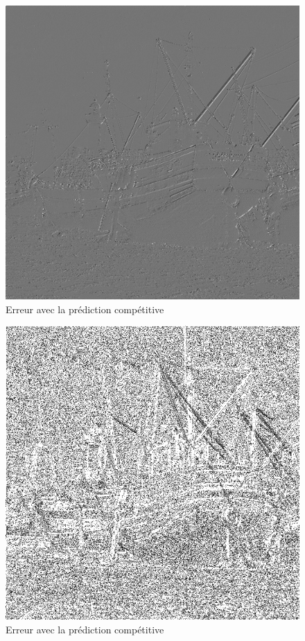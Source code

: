 \documentclass[12pt]{report}
\begin{document}
\begin{figure}[H]
\begin{center}
\includegraphics[scale=0.4]{../ImageRes/ImagecodeeCompetitifQ1.jpg} 
\caption{Erreur avec la prédiction compétitive}
\end{center}
\end{figure}

\begin{figure}[H]
\begin{center}
\includegraphics[scale=0.4]{../ImageRes/erreur.jpg} 
\caption{Erreur avec la prédiction compétitive}
\end{center}
\end{figure}
\end{document}

